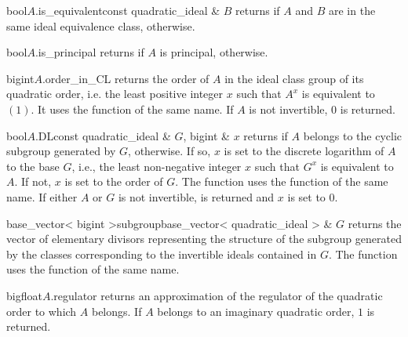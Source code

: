 

\begin{cfcode}{bool}{$A$.is_equivalent}{const quadratic_ideal & $B$}
  returns \TRUE if $A$ and $B$ are in the same ideal equivalence class, \FALSE otherwise.
\end{cfcode}

\begin{cfcode}{bool}{$A$.is_principal}{}
  returns \TRUE if $A$ is principal, \FALSE otherwise.
\end{cfcode}




\begin{fcode}{bigint}{$A$.order_in_CL}{}
  returns the order of $A$ in the ideal class group of its quadratic order, i.e. the least
  positive integer $x$ such that $A^x$ is equivalent to $(1)$.  It uses the 
  function of the same name.  If $A$ is not invertible, $0$ is returned.
\end{fcode}

\begin{cfcode}{bool}{$A$.DL}{const quadratic_ideal & $G$, bigint & $x$}
  returns \TRUE if $A$ belongs to the cyclic subgroup generated by $G$, \FALSE otherwise.  If
  so, $x$ is set to the discrete logarithm of $A$ to the base $G$, i.e., the least non-negative
  integer $x$ such that $G^x$ is equivalent to $A$.  If not, $x$ is set to the order of $G$.
  The function uses the  function of the same name.  If either $A$ or $G$ is not
  invertible, \FALSE is returned and $x$ is set to $0$.
\end{cfcode}

\begin{fcode}{base_vector< bigint >}{subgroup}{base_vector< quadratic_ideal > & $G$}
  returns the vector of elementary divisors representing the structure of the subgroup generated
  by the classes corresponding to the invertible ideals contained in $G$.  The function uses the
   function of the same name.
\end{fcode}

\begin{fcode}{bigfloat}{$A$.regulator}{}
  returns an approximation of the regulator of the quadratic order to which $A$ belongs.  If $A$
  belongs to an imaginary quadratic order, $1$ is returned.
\end{fcode}

